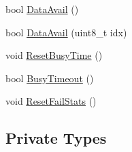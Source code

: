 \begin{DoxyCompactItemize}
\item 
bool \hyperlink{class_i_m_u_a0bd84946a218d910f248cfa8edf00a5c}{DataAvail} ()
\item 
bool \hyperlink{class_i_m_u_a492e190eef142fc6bc674cca4700f1e3}{DataAvail} (uint8\_\-t idx)
\item 
void \hyperlink{class_i_m_u_ab3992da77876e9b5cae8bc9d1334ff7b}{ResetBusyTime} ()
\item 
bool \hyperlink{class_i_m_u_a6a61733d65cf2b60db212e0be9a00fed}{BusyTimeout} ()
\item 
void \hyperlink{class_i_m_u_a89de27b845ce9e103436cfb7ae8e6441}{ResetFailStats} ()
\end{DoxyCompactItemize}
\subsection*{Private Types}
